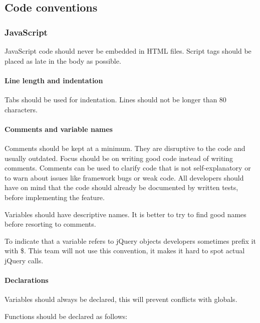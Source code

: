 \subsection{Code conventions}

\subsubsection{JavaScript}

JavaScript code should never be embedded in HTML files. Script tags should be
placed as late in the body as possible. \cite{crockford:code}

\paragraph{Line length and indentation} \hspace{1mm}

Tabs should be used for indentation.
Lines should not be longer than 80 characters.

\paragraph{Comments and variable names} \hspace{1mm}

Comments should be kept at a minimum. They are disruptive to the code and
usually outdated. Focus should be on writing good code instead of writing comments. Comments can be used to
clarify code that is not self-explanatory or to warn about issues like
framework bugs or weak code. All developers should have on mind that the code should already
be documented by written tests, before implementing the feature.

Variables should have descriptive names. It is better to try to find good names before
resorting to comments.

To indicate that a variable refers to jQuery objects developers sometimes
prefix it with \$. This team will not use this convention, it makes it hard to
spot actual jQuery calls.

\paragraph{Declarations} \hspace{1mm}

Variables should always be declared, this will prevent conflicts with globals.

Functions should be declared as follows:

